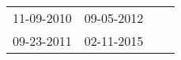 \begin{supertabular}{llll}
 11-09-2010 &  09-05-2012 \\
 09-23-2011 &  02-11-2015 \\
\end{supertabular}
